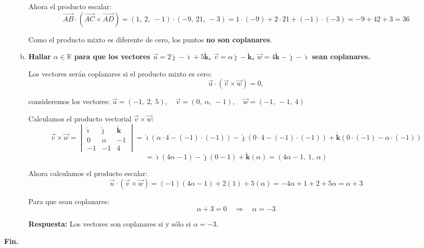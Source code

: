 \documentclass[11pt,a4paper]{article}
\newcommand{\iv}{\bm{\check{\imath}}}
\newcommand{\jv}{\bm{\check{\jmath}}}
\newcommand{\kv}{\check{\bm k}}
\begin{document}
\begin{enumerate}[\hspace{-5mm} 1) ]
\begin{enumerate}[a)]
    Ahora el producto escalar:
    \[
    \overrightarrow{AB} \cdot (\overrightarrow{AC} \times \overrightarrow{AD}) = (1,\ 2,\ -1) \cdot (-9,\ 21,\ -3) = 1\cdot(-9) + 2\cdot21 + (-1)\cdot(-3) = -9 + 42 + 3 = 36
    \]

    Como el producto mixto es diferente de cero, los puntos \textbf{no son coplanares}.

    \vspace{5mm}

    \item \textbf{Hallar $\alpha \in \mathbb{R}$ para que los vectores $\vec{u} = 2\jv - \iv + 5\kv$, $\vec{v} = \alpha \jv - \kv$, $\vec{w} = 4\kv - \jv - \iv$ sean coplanares.}

    Los vectores serán coplanares si el producto mixto es cero:
    \[
    \vec{u} \cdot (\vec{v} \times \vec{w}) = 0,
    \]

    \noindent consideremos los vectores: \quad $\vec{u} = (-1,\ 2,\ 5), \quad \vec{v} = (0,\ \alpha,\ -1), \quad \vec{w} = (-1,\ -1,\ 4)$ 

    Calculamos el producto vectorial $\vec{v} \times \vec{w}$:
    \[
    \vec{v} \times \vec{w} =
    \begin{vmatrix}
        \iv & \jv & \kv \\
        0 & \alpha & -1 \\
        -1 & -1 & 4
    \end{vmatrix}
    = \iv(\alpha\cdot4 - (-1)\cdot(-1)) - \jv(0\cdot4 - (-1)\cdot(-1)) + \kv(0\cdot(-1) - \alpha\cdot(-1))
    \]
    \[
    = \iv(4\alpha - 1) - \jv(0 - 1) + \kv(\alpha) = (4\alpha - 1,\ 1,\ \alpha)
    \]

    Ahora calculamos el producto escalar:
    \[
    \vec{u} \cdot (\vec{v} \times \vec{w}) = (-1)(4\alpha - 1) + 2(1) + 5(\alpha)
    = -4\alpha + 1 + 2 + 5\alpha = \alpha + 3
    \]

    Para que sean coplanares:
    \[
    \alpha + 3 = 0 \quad \Rightarrow \quad \alpha = -3
    \]

    \textbf{Respuesta:} Los vectores son coplanares si y sólo si $\boxed{\alpha = -3}$.
\end{enumerate}
   








\end{enumerate}




\hfill{\bf \huge Fin.}
\end{document}
